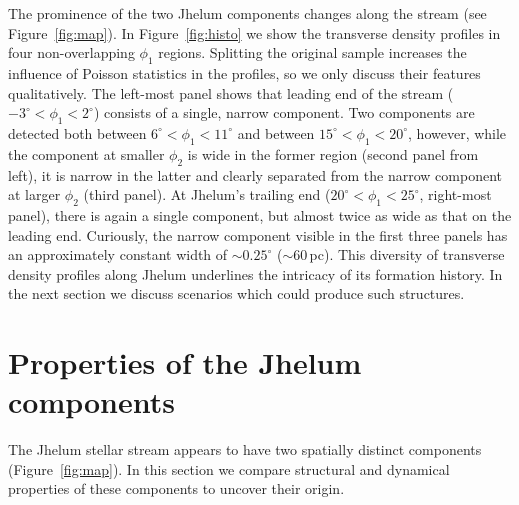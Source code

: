 \documentclass[twocolumn]{aastex62}
\begin{document}
The prominence of the two Jhelum components changes along the stream (see Figure~\ref{fig:map}).
In Figure~\ref{fig:histo} we show the transverse density profiles in four non-overlapping $\phi_1$ regions.
Splitting the original sample increases the influence of Poisson statistics in the profiles, so we only discuss their features qualitatively.
The left-most panel shows that leading end of the stream ($-3^\circ<\phi_1<2^\circ$) consists of a single, narrow component.
Two components are detected both between $6^\circ<\phi_1<11^\circ$ and between $15^\circ<\phi_1<20^\circ$, however, while the component at smaller $\phi_2$ is wide in the former region (second panel from left), it is narrow in the latter and clearly separated from the narrow component at larger $\phi_2$ (third panel).
At Jhelum's trailing end ($20^\circ<\phi_1<25^\circ$, right-most panel), there is again a single component, but almost twice as wide as that on the leading end.
Curiously, the narrow component visible in the first three panels has an approximately constant width of $\sim0.25^\circ$ ($\sim60\,$pc).
This diversity of transverse density profiles along Jhelum underlines the intricacy of its formation history.
In the next section we discuss scenarios which could produce such structures.

\section{Properties of the Jhelum components}
\label{sec:origin}
The Jhelum stellar stream appears to have two spatially distinct components (Figure~\ref{fig:map}).
In this section we compare structural and dynamical properties of these components to uncover their origin.

\end{document}
